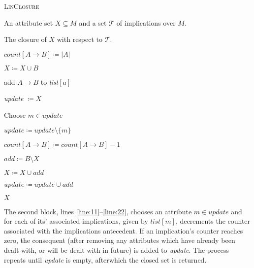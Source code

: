 \begin{algo}
	{\textsc{LinClosure}}

	\label{algorithm:LinClosure}

	\Require An attribute set $X\subseteq M$ and a set $\mathcal{T}$ of implications over $M$.

	\Ensure The closure of $X$ with respect to $\mathcal{T}$.

	 \label{line:1}

	\State $\textit{count}[A \rightarrow B] \coloneqq \vert A \vert$


	\State $X \coloneqq X \cup B$

	\EndIf


	\State add $A \rightarrow B$ to \textit{list}$[a]$

	\EndFor

	\EndFor \label{line:8}

	\State \textit{update} $\coloneqq X$

	 \label{line:11}

	\State Choose $m \in \textit{update}$

	\State $\textit{update}\coloneqq \textit{update}\setminus \{m\}$


	\State $\textit{count}[A \rightarrow B] \coloneqq \textit{count}[A \rightarrow B] - 1$

	\EndFor


	\State $\textit{add}\coloneqq B \setminus X$

	\State $X \coloneqq X \cup \textit{add}$

	\State $\textit{update}\coloneqq \textit{update}\cup \textit{add}$

	\EndIf

	\EndWhile \label{line:22}

	\State \Return $X$
\end{algo}

The second block, lines \ref{line:11}--\ref{line:22}, chooses an attribute $m \in \textit{update}$ and for each of its'
associated implications, given by $\textit{list}[m]$, decrements the counter associated with the implications antecedent.
If an implication's counter reaches zero, the consequent (after removing any attributes which have already been dealt with,
or will be dealt with in future) is added to \textit{update}. The process repeats until \textit{update} is empty, afterwhich
the closed set is returned.

